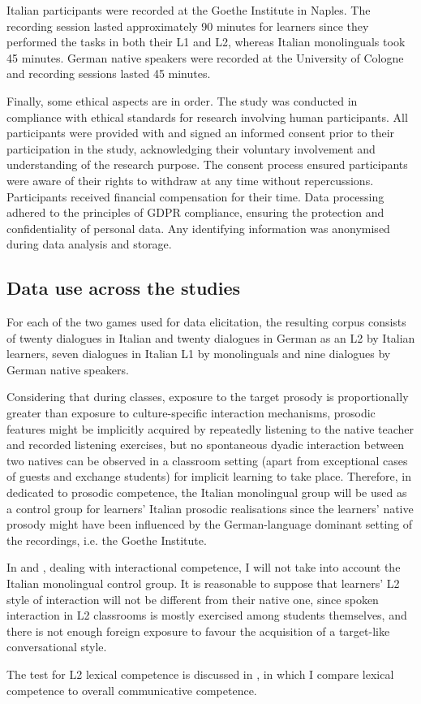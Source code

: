 Italian participants were recorded at the Goethe Institute in Naples. The recording session lasted approximately 90 minutes for learners since they performed the tasks in both their L1 and L2, whereas Italian monolinguals took 45 minutes. German native speakers were recorded at the University of Cologne and recording sessions lasted 45 minutes.

Finally, some ethical aspects are in order. The study was conducted in compliance with ethical standards for research involving human participants. All participants were provided with and signed an informed consent prior to their participation in the study, acknowledging their voluntary involvement and understanding of the research purpose. The consent process ensured participants were aware of their rights to withdraw at any time without repercussions. Participants received financial compensation for their time. Data processing adhered to the principles of GDPR compliance, ensuring the protection and confidentiality of personal data. Any identifying information was anonymised during data analysis and storage.

\subsection{ Data use across the studies}
\label{sec:1.3.3}

For each of the two games used for data elicitation, the resulting corpus consists of twenty dialogues in Italian and twenty dialogues in German as an L2 by Italian learners, seven dialogues in Italian L1 by monolinguals and nine dialogues by German native speakers.

Considering that during classes, exposure to the target prosody is proportionally greater than exposure to culture-specific interaction mechanisms, prosodic features might be implicitly acquired by repeatedly listening to the native teacher and recorded listening exercises, but no spontaneous dyadic interaction between two natives can be observed in a classroom setting (apart from exceptional cases of guests and exchange students) for implicit learning to take place. Therefore, in  dedicated to prosodic competence, the Italian monolingual group will be used as a control group for learners’ Italian prosodic realisations since the learners’ native prosody might have been influenced by the German-language dominant setting of the recordings, i.e. the Goethe Institute.

In  and , dealing with interactional competence, I will not take into account the Italian monolingual control group. It is reasonable to suppose that learners’ L2 style of interaction will not be different from their native one, since spoken interaction in L2 classrooms is mostly exercised among students themselves, and there is not enough foreign exposure to favour the acquisition of a target-like conversational style.

The test for L2 lexical competence is discussed in , in which I compare lexical competence to overall communicative competence.
